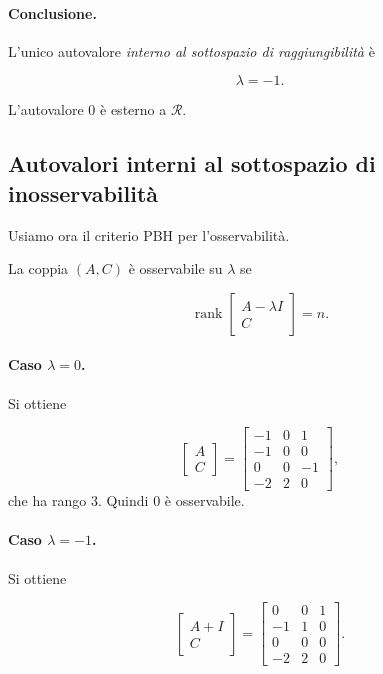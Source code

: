 \paragraph{Conclusione.}
L'unico autovalore \emph{interno al sottospazio di raggiungibilità} è

\[
\boxed{\lambda=-1.}
\]

L'autovalore \(0\) è esterno a \(\mathcal R\).

\bigskip

\subsection{Autovalori interni al sottospazio di inosservabilità}

Usiamo ora il criterio PBH per l'osservabilità.

La coppia \((A,C)\) è osservabile su \(\lambda\) se

\[
\operatorname{rank}
\begin{bmatrix}
A-\lambda I\\
C
\end{bmatrix}=n.
\]

\paragraph{Caso \(\lambda=0\).}
Si ottiene

\[
\begin{bmatrix}
A\\
C
\end{bmatrix}
=
\begin{bmatrix}
-1 & 0 & 1\\
-1 & 0 & 0\\
0 & 0 & -1\\
-2 & 2 & 0
\end{bmatrix},
\]
che ha rango \(3\). Quindi \(0\) è osservabile.

\paragraph{Caso \(\lambda=-1\).}
Si ottiene

\[
\begin{bmatrix}
A+I\\
C
\end{bmatrix}
=
\begin{bmatrix}
0 & 0 & 1\\
-1 & 1 & 0\\
0 & 0 & 0\\
-2 & 2 & 0
\end{bmatrix}.
\]

